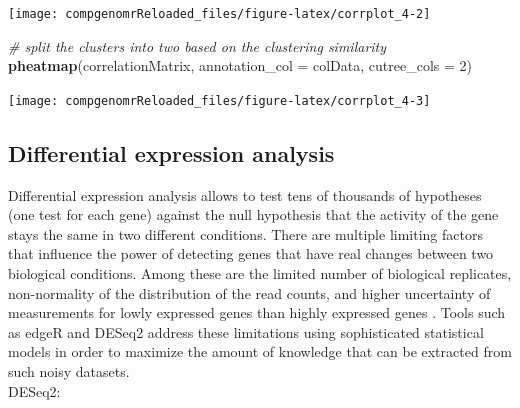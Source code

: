 \documentclass[12pt,]{krantz}
\newenvironment{Shaded}{\begin{snugshade}}{\end{snugshade}}
\newcommand{\CommentTok}[1]{\textcolor[rgb]{0.56,0.35,0.01}{\textit{#1}}}
\newcommand{\DataTypeTok}[1]{\textcolor[rgb]{0.13,0.29,0.53}{#1}}
\newcommand{\DecValTok}[1]{\textcolor[rgb]{0.00,0.00,0.81}{#1}}
\newcommand{\KeywordTok}[1]{\textcolor[rgb]{0.13,0.29,0.53}{\textbf{#1}}}
\newcommand{\NormalTok}[1]{#1}
\begin{document}
\begin{center}\texttt{[image: compgenomrReloaded\_files/figure-latex/corrplot\_4-2]} \end{center}

\begin{Shaded}
\begin{Highlighting}[]
\CommentTok{# split the clusters into two based on the clustering similarity }
\KeywordTok{pheatmap}\NormalTok{(correlationMatrix,  }\DataTypeTok{annotation_col =}\NormalTok{ colData, }\DataTypeTok{cutree_cols =} \DecValTok{2}\NormalTok{)}
\end{Highlighting}
\end{Shaded}

\begin{center}\texttt{[image: compgenomrReloaded\_files/figure-latex/corrplot\_4-3]} \end{center}

\hypertarget{differential-expression-analysis}{%
\subsection{Differential expression analysis}\label{differential-expression-analysis}}

Differential expression analysis allows to test tens of thousands of hypotheses (one test for each gene) against the null hypothesis that the activity of the gene stays the same in two different conditions. There are multiple limiting factors that influence the power of detecting genes that have real changes between two biological conditions. Among these are the limited number of biological replicates, non-normality of the distribution of the read counts, and higher uncertainty of measurements for lowly expressed genes than highly expressed genes \citep{love_moderated_2014}. Tools such as edgeR and DESeq2 address these limitations using sophisticated statistical models in order to maximize the amount of knowledge that can be extracted from such noisy datasets.\\
DESeq2:
\end{document}
